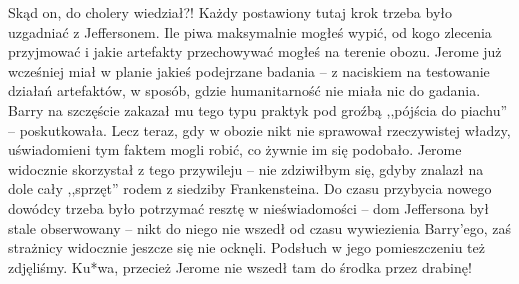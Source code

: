 \documentclass[../MAIN.tex]{subfiles}
\begin{document}
Skąd on, do cholery wiedział?!
Każdy postawiony tutaj krok trzeba było uzgadniać z Jeffersonem. Ile piwa maksymalnie mogłeś wypić, od kogo zlecenia przyjmować i jakie artefakty przechowywać mogłeś na terenie obozu. Jerome już wcześniej miał w planie jakieś podejrzane badania -- z naciskiem na testowanie działań artefaktów, w sposób, gdzie humanitarność nie miała nic do gadania. Barry na szczęście zakazał mu tego typu praktyk pod groźbą ,,pójścia do piachu'' -- poskutkowała. Lecz teraz, gdy w obozie nikt nie sprawował rzeczywistej władzy, uświadomieni tym faktem mogli robić, co żywnie im się podobało. Jerome widocznie skorzystał z tego przywileju -- nie zdziwiłbym się, gdyby znalazł na dole cały ,,sprzęt'' rodem z siedziby Frankensteina. Do czasu przybycia nowego dowódcy trzeba było potrzymać resztę w nieświadomości -- dom Jeffersona był stale obserwowany -- nikt do niego nie wszedł od czasu wywiezienia Barry’ego, zaś strażnicy widocznie jeszcze się nie ocknęli. Podsłuch w jego pomieszczeniu też zdjęliśmy. Ku*wa, przecież Jerome nie wszedł 
tam do środka przez drabinę!
\end{document}
